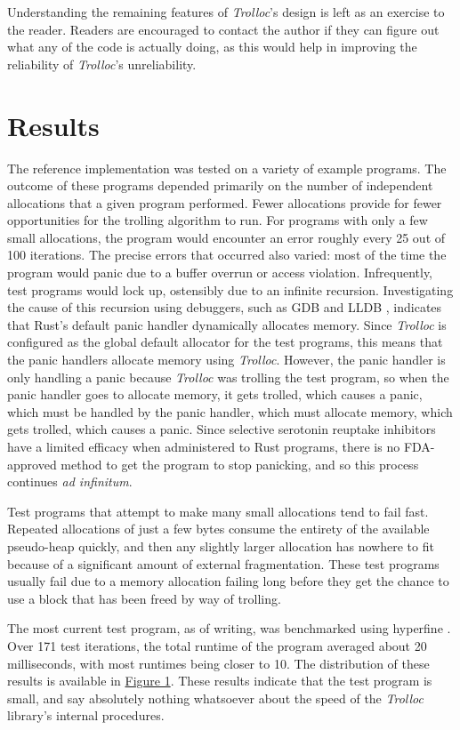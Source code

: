 \documentclass{article}
\begin{document}
Understanding the remaining features of \textit{Trolloc}'s design is left as an exercise to the reader. Readers are encouraged to contact the author if they can figure out what any of the code is actually doing, as this would help in improving the reliability of \textit{Trolloc}'s unreliability.

\section{Results}
The reference implementation was tested on a variety of example programs. The outcome of these programs depended primarily on the number of independent allocations that a given program performed. Fewer allocations provide for fewer opportunities for the trolling algorithm to run. For programs with only a few small allocations, the program would encounter an error roughly every 25 out of 100 iterations. The precise errors that occurred also varied: most of the time the program would panic due to a buffer overrun or access violation. Infrequently, test programs would lock up, ostensibly due to an infinite recursion. Investigating the cause of this recursion using debuggers, such as GDB \cite{gdb} and LLDB \cite{lldb}, indicates that Rust's default panic handler dynamically allocates memory. Since \textit{Trolloc} is configured as the global default allocator for the test programs, this means that the panic handlers allocate memory using \textit{Trolloc}. However, the panic handler is only handling a panic because \textit{Trolloc} was trolling the test program, so when the panic handler goes to allocate memory, it gets trolled, which causes a panic, which must be handled by the panic handler, which must allocate memory, which gets trolled, which causes a panic. Since selective serotonin reuptake inhibitors have a limited efficacy when administered to Rust programs, there is no FDA-approved method to get the program to stop panicking, and so this process continues \textit{ad infinitum}.

Test programs that attempt to make many small allocations tend to fail fast. Repeated allocations of just a few bytes consume the entirety of the available pseudo-heap quickly, and then any slightly larger allocation has nowhere to fit because of a significant amount of external fragmentation. These test programs usually fail due to a memory allocation failing long before they get the chance to use a block that has been freed by way of trolling.

The most current test program, as of writing, was benchmarked using hyperfine \cite{hyperfine}. Over 171 test iterations, the total runtime of the program averaged about 20 milliseconds, with most runtimes being closer to 10. The distribution of these results is available in \hyperref[fig1:times]{Figure 1}. These results indicate that the test program is small, and say absolutely nothing whatsoever about the speed of the \textit{Trolloc} library's internal procedures.
\end{document}
